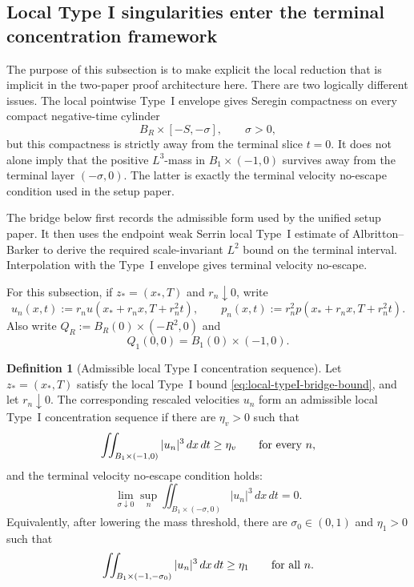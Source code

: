 \documentclass[11pt]{amsart}
\numberwithin{equation}{section}
\theoremstyle{plain}
\theoremstyle{definition}
\newtheorem{definition}[theorem]{Definition}
\theoremstyle{remark}
\begin{document}
\subsection{Local Type I singularities enter the terminal concentration framework}
\label{sec:local-typeI-bridge}

The purpose of this subsection is to make explicit the local reduction that is
implicit in the two-paper proof architecture here.  There are two logically
different issues.  The local pointwise Type~I envelope gives Seregin compactness
on every compact negative-time cylinder
\[
   B_R\times[-S,-\sigma],\qquad \sigma>0,
\]
but this compactness is strictly away from the terminal slice \(t=0\).  It does
not alone imply that the positive \(L^3\)-mass in
\(B_1\times(-1,0)\) survives away from the terminal layer
\((- \sigma,0)\).  The latter is exactly the terminal velocity no-escape
condition used in the setup paper.

The bridge below first records the admissible form used by the unified setup
paper.  It then uses the endpoint weak Serrin local Type~I estimate of
Albritton--Barker to derive the required scale-invariant \(L^2\) bound on the
terminal interval.  Interpolation with the Type~I envelope gives terminal
velocity no-escape.

For this subsection, if \(z_*=(x_*,T)\) and \(r_n\downarrow0\), write
\[
   u_n(x,t):=r_nu(x_*+r_nx,T+r_n^2t),
   \qquad
   p_n(x,t):=r_n^2p(x_*+r_nx,T+r_n^2t).
\]
Also write \(Q_R:=B_R(0)\times(-R^2,0)\) and
\[
   Q_1(0,0)=B_1(0)\times(-1,0).
\]

\begin{definition}[Admissible local Type I concentration sequence]
\label{def:admissible-local-typeI-sequence}
Let \(z_*=(x_*,T)\) satisfy the local Type~I bound
\eqref{eq:local-typeI-bridge-bound}, and let \(r_n\downarrow0\).  The
corresponding rescaled velocities \(u_n\) form an admissible local Type~I
concentration sequence if there are \(\eta_v>0\) such that
\begin{equation}\label{eq:admissible-local-typeI-positive-mass}
   \iint_{B_1\times(-1,0)} |u_n|^3\,dx\,dt\ge\eta_v
   \qquad\hbox{for every }n,
\end{equation}
and the terminal velocity no-escape condition holds:
\begin{equation}\label{eq:admissible-local-typeI-no-escape}
   \lim_{\sigma\downarrow0}
   \sup_n
   \iint_{B_1\times(-\sigma,0)} |u_n|^3\,dx\,dt=0 .
\end{equation}
Equivalently, after lowering the mass threshold, there are
\(\sigma_0\in(0,1)\) and \(\eta_1>0\) such that
\begin{equation}\label{eq:admissible-local-typeI-away-mass}
   \iint_{B_1\times(-1,-\sigma_0)} |u_n|^3\,dx\,dt\ge\eta_1
   \qquad\hbox{for all }n .
\end{equation}
\end{definition}
\end{document}
